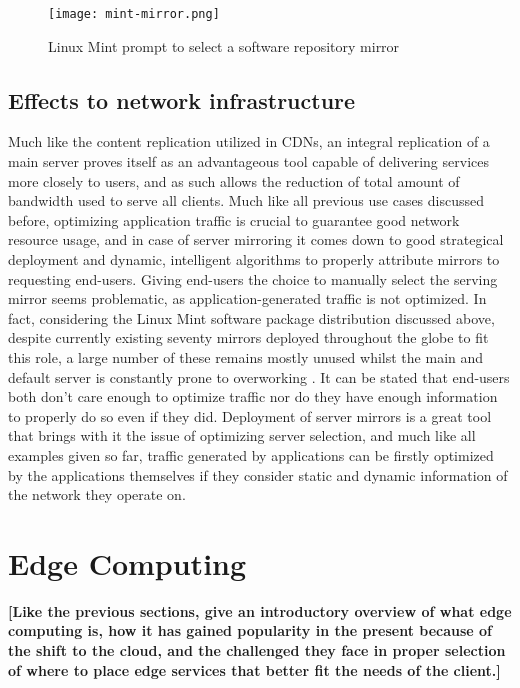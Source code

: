     \begin{figure}[!h]
    \centering
    \texttt{[image: mint-mirror.png]}
    \caption{Linux Mint prompt to select a software repository mirror}
    \label{fig:mint-mirrors}
    \end{figure}

    \subsection{Effects to network infrastructure}

        Much like the content replication utilized in CDNs, an integral replication of a main server proves itself as an advantageous tool capable of delivering services more closely to users, and as such allows the reduction of total amount of bandwidth used to serve all clients.
        Much like all previous use cases discussed before, optimizing application traffic is crucial to guarantee good network resource usage, and in case of server mirroring it comes down to good strategical deployment and dynamic, intelligent algorithms to properly attribute mirrors to requesting end-users.
        Giving end-users the choice to manually select the serving mirror seems problematic, as application-generated traffic is not optimized.
        In fact, considering the Linux Mint software package distribution discussed above, despite currently existing seventy mirrors deployed throughout the globe to fit this role, a large number of these remains mostly unused whilst the main and default server is constantly prone to overworking \cite{mint-article}.
        It can be stated that end-users both don't care enough to optimize traffic nor do they have enough information to properly do so even if they did.
        Deployment of server mirrors is a great tool that brings with it the issue of optimizing server selection, and much like all examples given so far, traffic generated by applications can be firstly optimized by the applications themselves if they consider static and dynamic information of the network they operate on.


    \section{Edge Computing}

    \textbf{[Like the previous sections, give an introductory overview of what edge computing is, how it has gained popularity in the present because of the shift to the cloud, and the challenged they face in proper selection of where to place edge services that better fit the needs of the client.]}


